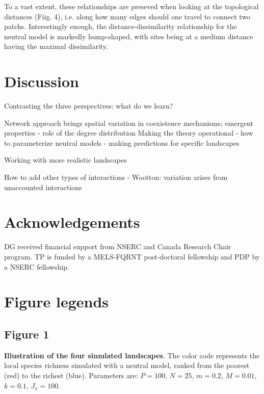 \documentclass[12pt]{article}
\begin{document}
To a vast extent, these relationships are preseved when looking at the
topological distances (Fiig. 4), i.e. along how many edges should one travel to connect
two patchs. Interestingly enough, the distance-dissimilarity relationship for
the neutral model is markedly hump-shaped, with sites being at a medium distance
having the maximal dissimilarity.

\section{Discussion}

Contrasting the three perspectives: what do we learn?

Network approach brings spatial variation in coexistence mechanisms; emergent properties
	- role of the degree distribution
Making the theory operational
	- how to parameterize neutral models
	- making predictions for specific landscapes

Working with more realistic landscapes

How to add other types of interactions
	- Wootton: variation arises from unaccounted interactions


\section{Acknowledgements}
DG received financial support from NSERC and Canada Research Chair program. TP
is funded by a MELS-FQRNT post-doctoral fellowship and PDP by a NSERC
fellowship.
\newpage

\printbibliography

\newpage
\section*{Figure legends}

\subsection*{Figure 1}
\textbf{Illustration of the four simulated landscapes}. The color code
represents the local species richness simulated with a neutral model, ranked
from the poorest (red) to the richest (blue). Parameters are: $P = 100$, $N =
25$, $m = 0.2$, $M = 0.01$, $k = 0.1$, $J_x = 100$.
\end{document}
